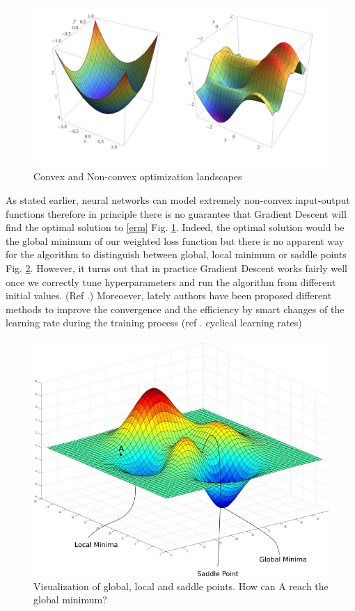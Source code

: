 \documentclass[LaM,binding=0.6cm]{./packages/sapthesis/sapthesis}
\begin{document}
            \begin{figure}[h]
                \centering
                \includegraphics[scale=0.25]{conv_nonconv}
                \caption{Convex and Non-convex optimization landscapes}
                \label{fig:convnonconv}
            \end{figure}
            As stated earlier, neural networks can model extremely non-convex input-output functions therefore in principle there
            is no guarantee that Gradient Descent will find the optimal solution to \ref{erm} Fig. \ref{fig:convnonconv}.
            Indeed, the optimal solution would be the global minimum of our weighted loss function but there is no apparent
            way for the algorithm to distinguish between global, local minimum or saddle points Fig. \ref{fig:globlocsad}.
            However, it turns out that in practice Gradient Descent works fairly well once we correctly tune
            hyperparameters and run the algorithm from different initial values. (Ref .)
            Moreoever, lately authors have been proposed different methods to improve the convergence and the efficiency by 
            smart changes of the learning rate during the training process (ref . cyclical learning rates) 
            \begin{figure}[h]
                \centering
                \includegraphics[scale=0.35]{globlocsad}
                \caption{Visualization of global, local and saddle points. How can A reach the global minimum?}
                \label{fig:globlocsad}
            \end{figure}
\end{document}
